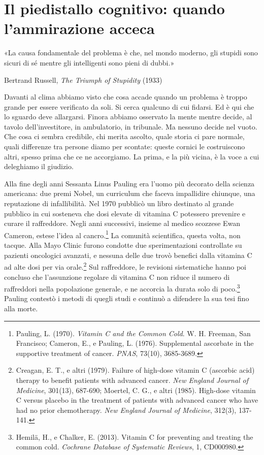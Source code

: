 \chapter{Il piedistallo cognitivo: quando l'ammirazione acceca}
\label{cap:p2c16}

\epigraph{«La causa fondamentale del problema è che, nel mondo moderno, gli stupidi sono sicuri di sé mentre gli intelligenti sono pieni di dubbi.»}{Bertrand Russell, \textit{The Triumph of Stupidity} (1933)}

Davanti al clima abbiamo visto che cosa accade quando un problema è troppo grande per essere verificato da soli. Si cerca qualcuno di cui fidarsi. Ed è qui che lo sguardo deve allargarsi. Finora abbiamo osservato la mente mentre decide, al tavolo dell'investitore, in ambulatorio, in tribunale. Ma nessuno decide nel vuoto. Che cosa ci sembra credibile, chi merita ascolto, quale storia ci pare normale, quali differenze tra persone diamo per scontate: queste cornici le costruiscono altri, spesso prima che ce ne accorgiamo. La prima, e la più vicina, è la voce a cui deleghiamo il giudizio.

Alla fine degli anni Sessanta Linus Pauling era l'uomo pi\`{u} decorato della scienza americana: due premi Nobel, un curriculum che faceva impallidire chiunque, una reputazione di infallibilit\`{a}. Nel 1970 pubblic\`{o} un libro destinato al grande pubblico in cui sosteneva che dosi elevate di vitamina C potessero prevenire e curare il raffreddore. Negli anni successivi, insieme al medico scozzese Ewan Cameron, estese l'idea al cancro.\footnote{Pauling, L. (1970). \textit{Vitamin C and the Common Cold}. W. H. Freeman, San Francisco; Cameron, E., e Pauling, L. (1976). Supplemental ascorbate in the supportive treatment of cancer. \textit{PNAS}, 73(10), 3685-3689.} La comunità scientifica, questa volta, non tacque. Alla Mayo Clinic furono condotte due sperimentazioni controllate su pazienti oncologici avanzati, e nessuna delle due trovò benefici dalla vitamina C ad alte dosi per via orale.\footnote{Creagan, E. T., e altri (1979). Failure of high-dose vitamin C (ascorbic acid) therapy to benefit patients with advanced cancer. \textit{New England Journal of Medicine}, 301(13), 687-690; Moertel, C. G., e altri (1985). High-dose vitamin C versus placebo in the treatment of patients with advanced cancer who have had no prior chemotherapy. \textit{New England Journal of Medicine}, 312(3), 137-141.} Sul raffreddore, le revisioni sistematiche hanno poi concluso che l'assunzione regolare di vitamina C non riduce il numero di raffreddori nella popolazione generale, e ne accorcia la durata solo di poco.\footnote{Hemilä, H., e Chalker, E. (2013). Vitamin C for preventing and treating the common cold. \textit{Cochrane Database of Systematic Reviews}, 1, CD000980.} Pauling contestò i metodi di quegli studi e continuò a difendere la sua tesi fino alla morte.

